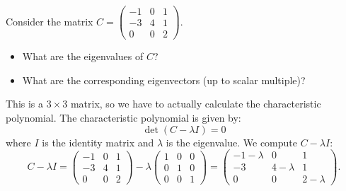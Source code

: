 \documentclass[addpoints, 12pt,answers]{exam}
\begin{document}
\begin{questions}
\question Consider the matrix  $C = \begin{pmatrix} -1 & 0 & 1\\-3 &4& 1\\0  &0& 2\end{pmatrix}$.
\begin{itemize}
\item What are the eigenvalues of $C$?
\item What are the corresponding eigenvectors (up to scalar multiple)?
\end{itemize}
\begin{solution}
  This is a $3 \times 3$ matrix, so we have to actually calculate the characteristic polynomial.
  The characteristic polynomial is given by:
  \[ \det(C - \lambda I) = 0 \]
  where $I$ is the identity matrix and $\lambda$ is the eigenvalue. We compute $C - \lambda I$:
  \[
  C - \lambda I = \begin{pmatrix} -1 & 0 & 1 \\ -3 & 4 & 1 \\ 0 & 0 & 2 \end{pmatrix} - \lambda \begin{pmatrix} 1 & 0 & 0 \\ 0 & 1 & 0 \\ 0 & 0 & 1 \end{pmatrix} = \begin{pmatrix} -1 - \lambda & 0 & 1 \\ -3 & 4 - \lambda & 1 \\ 0 & 0 & 2 - \lambda \end{pmatrix}.
  \]


\end{solution}
\end{questions}
\end{document}
